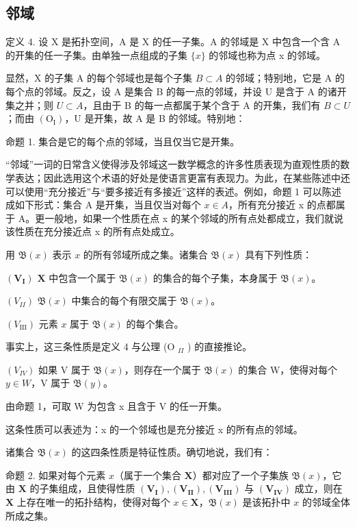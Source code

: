 \subsection{邻域}

定义 4. 设 X 是拓扑空间，A 是 X 的任一子集。A 的邻域是 X 中包含一个含 A 的开集的任一子集。由单独一点组成的子集 \(\{x\}\) 的邻域也称为点 x 的邻域。

显然，X 的子集 A 的每个邻域也是每个子集 \(B \subset A\) 的邻域；特别地，它是 A 的每个点的邻域。反之，设 A 是集合 B 的每一点的邻域，并设 U 是含于 A 的诸开集之并；则 \(U \subset A\)，且由于 B 的每一点都属于某个含于 A 的开集，我们有 \(B \subset U\)；而由 \((\mathrm{O}_{\mathrm{I}})\)，U 是开集，故 A 是 B 的邻域。特别地：

命题 1. 集合是它的每个点的邻域，当且仅当它是开集。

“邻域”一词的日常含义使得涉及邻域这一数学概念的许多性质表现为直观性质的数学表达；因此选用这个术语的好处是使语言更富有表现力。为此，在某些陈述中还可以使用“充分接近”与“要多接近有多接近”这样的表述。例如，命题 1 可以陈述成如下形式：集合 A 是开集，当且仅当对每个 \(x \in A\)，所有充分接近 x 的点都属于 A。更一般地，如果一个性质在点 x 的某个邻域的所有点处都成立，我们就说该性质在充分接近点 x 的所有点处成立。

用 \(\mathfrak{B}(x)\) 表示 \(x\) 的所有邻域所成之集。诸集合 \(\mathfrak{B}(x)\) 具有下列性质：

\((\mathbf{V}_{\mathbf{I}})\) \(\mathbf{X}\) 中包含一个属于 \(\mathfrak{B}(x)\) 的集合的每个子集，本身属于 \(\mathfrak{B}(x)\)。

\((V_{II})\) \(\mathfrak{B}(x)\) 中集合的每个有限交属于 \(\mathfrak{B}(x)\)。

\((V_{\mathrm{III}})\) 元素 \(x\) 属于 \(\mathfrak{B}(x)\) 的每个集合。

事实上，这三条性质是定义 4 与公理 (O \(_{II}\) ) 的直接推论。

\((V_{IV})\) 如果 V 属于 \(\mathfrak{B}(x)\)，则存在一个属于 \(\mathfrak{B}(x)\) 的集合 W，使得对每个 \(y \in W\)，V 属于 \(\mathfrak{B}(y)\)。

由命题 1，可取 W 为包含 x 且含于 V 的任一开集。

这条性质可以表述为：x 的一个邻域也是充分接近 x 的所有点的邻域。

诸集合 \(\mathfrak{B}(x)\) 的这四条性质是特征性质。确切地说，我们有：

命题 2. 如果对每个元素 \(x\)（属于一个集合 \(\mathbf{X}\)）都对应了一个子集族 \(\mathfrak{B}(x)\)，它由 \(\mathbf{X}\) 的子集组成，且使得性质 \((\mathbf{V}_{\mathbf{I}}), (\mathbf{V}_{\mathbf{II}}), (\mathbf{V}_{\mathbf{III}})\) 与 \((\mathbf{V}_{\mathbf{IV}})\) 成立，则在 \(\mathbf{X}\) 上存在唯一的拓扑结构，使得对每个 \(x \in \mathbf{X}\)，\(\mathfrak{B}(x)\) 是该拓扑中 \(x\) 的邻域全体所成之集。

